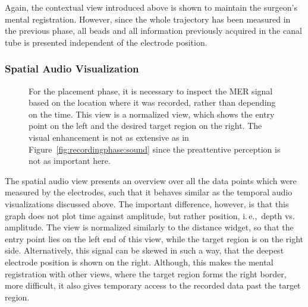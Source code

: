 \documentclass[journal]{vgtc}                %
\begin{document}
Again, the contextual view introduced above is shown to maintain the surgeon's mental registration. However, since the whole trajectory has been measured in the previous phase, all beads and all information previously acquired in the canal tube is presented independent of the electrode position. 


\subsubsection{Spatial Audio Visualization}\label{sec:overview:placement:spatialaudio}

\begin{figure}[t]
    \centering
    \caption{For the placement phase, it is necessary to inspect the MER signal based on the location where it was recorded, rather than depending on the time. This view is a normalized view, which shows the entry point on the left and the desired target region on the right. The visual enhancement is not as extensive as in Figure~\ref{fig:recordingphase:sound} since the preattentive perception is not as important here.}
    \label{fig:placementphase:spatialsound}
\end{figure}

The spatial audio view presents an overview over all the data points which were measured by the electrodes, such that it behaves similar as the temporal audio visualizations discussed above. The important difference, however, is that this graph does not plot time against amplitude, but rather position, i.\,e.,~depth vs. amplitude. The view is normalized similarly to the distance widget, so that the entry point lies on the left end of this view, while the target region is on the right side. Alternatively, this signal can be skewed in such a way, that the deepest electrode position is shown on the right. Although, this makes the mental registration with other views, where the target region forms the right border, more difficult, it also gives temporary access to the recorded data past the target region.
\end{document}

